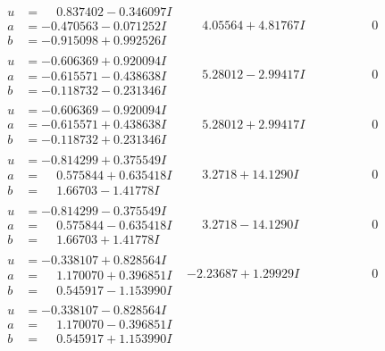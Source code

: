\documentclass[1p]{elsarticle_modified}
\theoremstyle{definition}
\begin{document}
$$\begin{array}{c|c|c}
\begin{aligned}
u &= \phantom{-}0.837402 - 0.346097 I \\
a &= -0.470563 - 0.071252 I \\
b &= -0.915098 + 0.992526 I\end{aligned}
 & \phantom{-}4.05564 + 4.81767 I & \phantom{-0.000000 } 0 \\ \hline\begin{aligned}
u &= -0.606369 + 0.920094 I \\
a &= -0.615571 - 0.438638 I \\
b &= -0.118732 - 0.231346 I\end{aligned}
 & \phantom{-}5.28012 - 2.99417 I & \phantom{-0.000000 } 0 \\ \hline\begin{aligned}
u &= -0.606369 - 0.920094 I \\
a &= -0.615571 + 0.438638 I \\
b &= -0.118732 + 0.231346 I\end{aligned}
 & \phantom{-}5.28012 + 2.99417 I & \phantom{-0.000000 } 0 \\ \hline\begin{aligned}
u &= -0.814299 + 0.375549 I \\
a &= \phantom{-}0.575844 + 0.635418 I \\
b &= \phantom{-}1.66703 - 1.41778 I\end{aligned}
 & \phantom{-}3.2718 + 14.1290 I & \phantom{-0.000000 } 0 \\ \hline\begin{aligned}
u &= -0.814299 - 0.375549 I \\
a &= \phantom{-}0.575844 - 0.635418 I \\
b &= \phantom{-}1.66703 + 1.41778 I\end{aligned}
 & \phantom{-}3.2718 - 14.1290 I & \phantom{-0.000000 } 0 \\ \hline\begin{aligned}
u &= -0.338107 + 0.828564 I \\
a &= \phantom{-}1.170070 + 0.396851 I \\
b &= \phantom{-}0.545917 - 1.153990 I\end{aligned}
 & -2.23687 + 1.29929 I & \phantom{-0.000000 } 0 \\ \hline\begin{aligned}
u &= -0.338107 - 0.828564 I \\
a &= \phantom{-}1.170070 - 0.396851 I \\
b &= \phantom{-}0.545917 + 1.153990 I\end{aligned}

\end{array}$$
\end{document}
